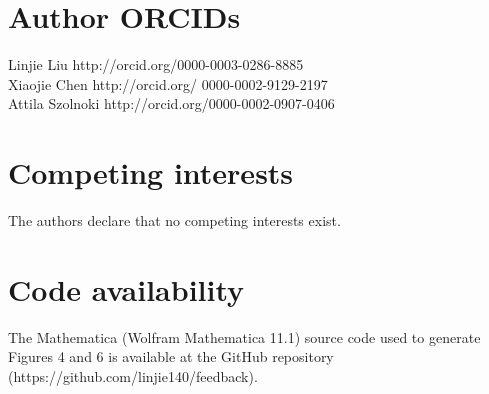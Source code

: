 \documentclass[9pt]{elife}
\begin{document}
\section{Author ORCIDs}
Linjie Liu http://orcid.org/0000-0003-0286-8885\\
Xiaojie Chen http://orcid.org/ 0000-0002-9129-2197\\
Attila Szolnoki http://orcid.org/0000-0002-0907-0406

\section{Competing interests}

The authors declare that no competing interests exist.

\section{Code availability}
The Mathematica (Wolfram Mathematica 11.1) source code used to generate Figures 4 and 6 is available at the GitHub repository (https://github.com/linjie140/feedback).
\end{document}
